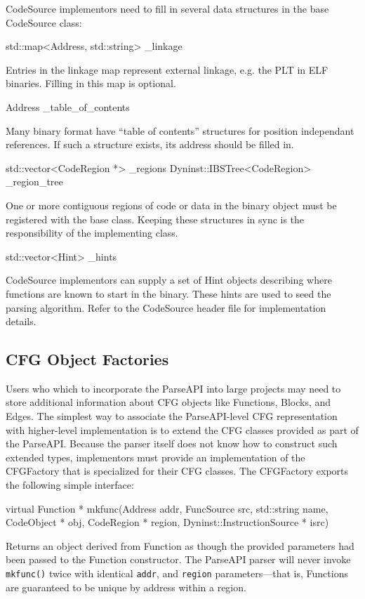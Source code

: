 \documentclass{article}
\newenvironment{apient}{\small\verbatim}{\endverbatim}
\newcommand{\apidesc}[1]{%
{\addtolength{\leftskip}{4em}%
#1\par\medskip}
}
\begin{document}
CodeSource implementors need to fill in several data structures in the base CodeSource class:

\begin{apient}
std::map<Address, std::string> _linkage
\end{apient}
\apidesc{Entries in the linkage map represent external linkage, e.g. the PLT in ELF binaries. Filling in this map is optional.}

\begin{apient}
Address _table_of_contents
\end{apient}
\apidesc{Many binary format have ``table of contents'' structures for position
independant references. If such a structure exists, its address should be filled in.}

\begin{apient}
std::vector<CodeRegion *> _regions
Dyninst::IBSTree<CodeRegion> _region_tree
\end{apient}
\apidesc{One or more contiguous regions of code or data in the binary object must be registered with the base class. Keeping these structures in sync is the responsibility of the implementing class.}

\begin{apient}
std::vector<Hint> _hints
\end{apient}
\apidesc{CodeSource implementors can supply a set of Hint objects describing where functions are known to start in the binary. These hints are used to seed the parsing algorithm. Refer to the CodeSource header file for implementation details.}

\subsection{CFG Object Factories}
\label{sec:factories}

Users who which to incorporate the ParseAPI into large projects may need to store additional information about CFG objects like Functions, Blocks, and Edges. The simplest way to associate the ParseAPI-level CFG representation with higher-level implementation is to extend the CFG classes provided as part of the ParseAPI. Because the parser itself does not know how to construct such extended types, implementors must provide an implementation of the CFGFactory that is specialized for their CFG classes. The CFGFactory exports the following simple interface:

\begin{apient}
virtual Function * mkfunc(Address addr, 
    FuncSource src,
    std::string name, 
    CodeObject * obj, 
    CodeRegion * region,
    Dyninst::InstructionSource * isrc)
\end{apient}
\apidesc{Returns an object derived from Function as though the provided parameters had been passed to the Function constructor. The ParseAPI parser will never invoke \texttt{mkfunc()} twice with identical \texttt{addr}, and \texttt{region} parameters---that is, Functions are guaranteed to be unique by address within a region.}
\end{document}

